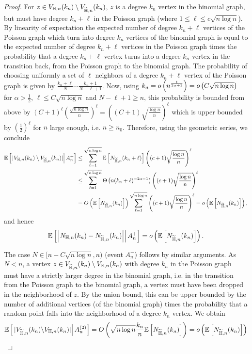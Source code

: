 \begin{proof}
For $z \in V_{\mathbb{H},n}(k_n) \setminus V_{\widetilde{\mathbb{H}},n}(k_n)$, $z$ is a degree $k_n$ vertex in the binomial graph, but 
must have degree $k_n+\ell$ in the Poisson graph (where $1 \leq \ell \leq c\sqrt{n\log n}$). By linearity of expectation the expected number of degree $k_n+\ell$ vertices of the Poisson graph which turn into degree $k_n$ vertices of the binomial graph is equal to the expected number of degree $k_n+\ell$ vertices in the Poisson graph times the probability that a degree $k_n+\ell$ vertex turns into a degree $k_n$ vertex in the transition back, from the Poisson graph to the binomial graph. The probability of choosing uniformly a set of $\ell$ neighbors of a degree $k_n+\ell$ vertex of the Poisson graph is given by $\frac{k_n+\ell}{N}\cdots \frac{k_n+1}{N-\ell + 1}$.  Now, using $k_n = o\left(n^{\frac{1}{2\alpha+1}}\right) = o\left(C\sqrt{n\log n}\right)$ for $\alpha > \frac{1}{2}$, $\ell \leq C\sqrt{n \log n}$ and $N-\ell + 1 \geq n$, this probability is bounded from above by $(C+1)^\ell (\frac{\sqrt{n \log n}}{n})^\ell =((C+1) \sqrt{\frac{\log n}{n}})^\ell$ which is upper bounded by $(\frac{1}{2})^\ell$ for $n$ large enough, i.e. $n \geq n_0$. Therefore, using the geometric series, we conclude
\begin{align*}
\mathbb{E}\left[\left.|V_{\mathbb{H},n}(k_n) \setminus V_{\widetilde{\mathbb{H}},n}(k_n)|\right|A_n^{+}\right] 
&\le  \sum_{\ell=1}^{\sqrt{n\log n}} \mathbb{E}\left[N_{\widetilde{\mathbb{H}},n}(k_n+\ell)\right] \left((c+1)\sqrt{\frac{\log n}{n}}\right)^{\ell}\\
&\le \sum_{\ell=1}^{\sqrt{n\log n}} \Theta\left(n (k_n+\ell)^{-2\alpha-1}\right) \left((c+1)\sqrt{\frac{\log n}{n}}\right)^{\ell}\\
&= O\left(\mathbb{E}\left[N_{\widetilde{\mathbb{H}},n}(k_n)\right]\right) \sum_{\ell=1}^{\sqrt{n\log n}} \left((c+1)\sqrt{\frac{\log n}{n}}\right)^{\ell}
= o\left(\mathbb{E}\left[N_{\widetilde{\mathbb{H}},n}(k_n)\right]\right),
\end{align*}
and hence
\[
	\mathbb{E}\left[\left.\left|N_{\mathbb{H},n}(k_n)-N_{\widetilde{\mathbb{H}},n}(k_n)\right|\right|A_n^{+}\right] = o\left(\mathbb{E}\left[N_{\widetilde{\mathbb{H}},n}(k_n)\right]\right).
\]

The case $N \in [n-C\sqrt{n\log n},n)$ (event $A_n^{-}$) follows by similar arguments. As $N < n$, a vertex $z \in V_{\widetilde{\mathbb{H}},n}(k_n) \setminus V_{\mathbb{H},n}(k_n)$ with degree $k_n$ in the Poisson graph must have a strictly larger degree in the binomial graph, i.e. in the transition from the Poisson graph to the binomial graph, a vertex must have been dropped in the neighborhood of $z$. By the union bound, this can be upper bounded by the number of additional vertices (of the binomial graph) times the probability that a random point falls into the neighborhood of a degree $k_n$ vertex. We obtain
\begin{align*}
	\mathbb{E}\left[\left.|V_{\widetilde{\mathbb{H}},n}(k_n) \backslash V_{\mathbb{H},n}(k_n)|\right|A_n^{(2)}\right] = O\left( \sqrt{n\log n}\frac{k_n}{n} \mathbb{E}\left[N_{\widetilde{\mathbb{H}},n}(k_n)\right] \right)
	= o\left(\mathbb{E}\left[N_{\widetilde{\mathbb{H}},n}(k_n)\right]\right)
\end{align*}


\end{proof}
